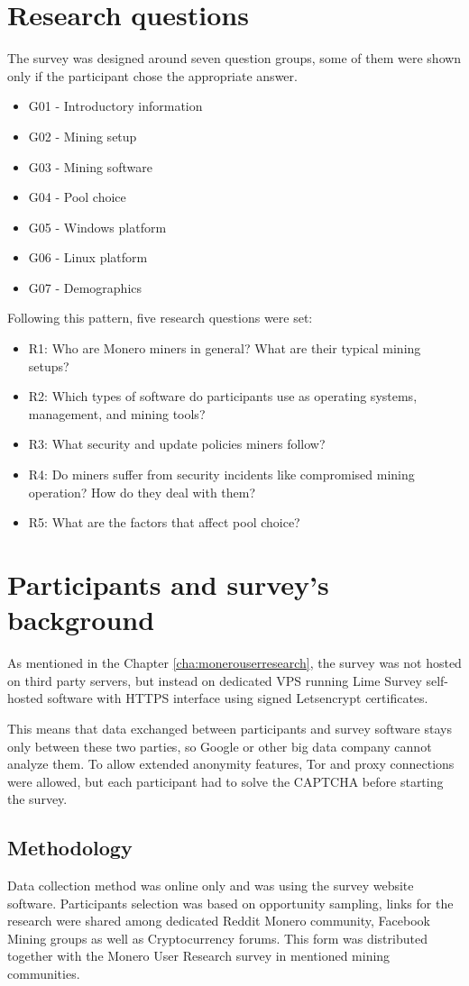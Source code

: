 \documentclass[
  printed, %
  table,   %
  nolof,     %
  nolot,     %
           oneside, color
]{fithesis3}
\begin{document}
\section{Research questions}
The survey was designed around seven question groups, some of them were shown only if the participant chose the appropriate answer.
\begin{itemize}\itemsep0em
\item G01 - Introductory information
\item G02 - Mining setup
\item G03 - Mining software
\item G04 - Pool choice
\item G05 - Windows platform
\item G06 - Linux platform
\item G07 - Demographics
\end{itemize}
Following this pattern, five research questions were set:
\begin{itemize}\itemsep0em
\item R1: Who are Monero miners in general? What are their typical mining setups? 
\item R2: Which types of software do participants use as operating systems, management, and mining tools?
\item R3: What security and update policies miners follow? 
\item R4: Do miners suffer from security incidents like compromised mining operation? How do they deal with them?
\item R5: What are the factors that affect pool choice?
\end{itemize}
\section{Participants and survey's background}
As mentioned in the Chapter \ref{cha:monerouserresearch}, the survey was not hosted on third party servers, but instead on dedicated VPS running Lime Survey self-hosted software with HTTPS interface using signed Letsencrypt certificates.

This means that data exchanged between participants and survey software stays only between these two parties, so Google or other big data company cannot analyze them. To allow extended anonymity features, Tor and proxy connections were allowed, but each participant had to solve the CAPTCHA before starting the survey.
\subsection{Methodology}
Data collection method was online only and was using the survey website software. Participants selection was based on opportunity sampling, links for the research were shared among dedicated Reddit Monero community, Facebook Mining groups as well as Cryptocurrency forums. This form was distributed together with the Monero User Research survey in mentioned mining communities.
\end{document}
